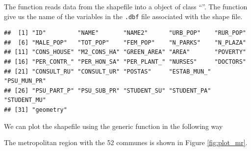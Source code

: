 The function  reads data from the shapefile into a  object of class ``''. The function  give us the name of the variables in the \texttt{.dbf} file associated with the shape file. 

\begin{knitrout}
\color{fgcolor}\begin{kframe}
\begin{alltt}
\end{alltt}
\begin{verbatim}
##  [1] "ID"         "NAME"       "NAME2"      "URB_POP"    "RUR_POP"   
##  [6] "MALE_POP"   "TOT_POP"    "FEM_POP"    "N_PARKS"    "N_PLAZA"   
## [11] "CONS_HOUSE" "M2_CONS_HA" "GREEN_AREA" "AREA"       "POVERTY"   
## [16] "PER_CONTR_" "PER_HON_SA" "PER_PLANT_" "NURSES"     "DOCTORS"   
## [21] "CONSULT_RU" "CONSULT_UR" "POSTAS"     "ESTAB_MUN_" "PSU_MUN_PR"
## [26] "PSU_PART_P" "PSU_SUB_PR" "STUDENT_SU" "STUDENT_PA" "STUDENT_MU"
## [31] "geometry"
\end{verbatim}
\end{kframe}
\end{knitrout}

We can plot the shapefile using the generic function  in the following way

\begin{knitrout}
\color{fgcolor}\begin{kframe}
\begin{alltt}
\hlstd{(}  \hlstd{=} \hlstd{,}  \hlstd{=} \hlstd{)}
\end{alltt}
\end{kframe}
\end{knitrout}

The metropolitan region with the 52 communes is shown in Figure \ref{fig:plot_mr}.


